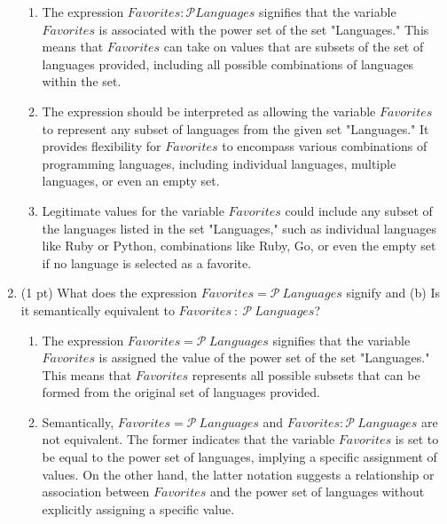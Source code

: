 \documentclass[12pt]{article}
\begin{document}
\begin{spacing}{1.5}
\begin{enumerate}
		      \begin{enumerate}
		      	\item The expression $Favorites : \mathcal{P} Languages$ signifies that the variable $Favorites$ is associated with the power set of the set "Languages." This means that $Favorites$ can take on values that are subsets of the set of languages provided, including all possible combinations of languages within the set. 
		      	      		      	                      
		      	\item The expression should be interpreted as allowing the variable $Favorites$ to represent any subset of languages from the given set "Languages." It provides flexibility for $Favorites$ to encompass various combinations of programming languages, including individual languages, multiple languages, or even an empty set. 
		      	      		      	                      
		      	\item Legitimate values for the variable $Favorites$ could include any subset of the languages listed in the set "Languages," such as individual languages like Ruby or Python, combinations like {Ruby, Go}, or even the empty set if no language is selected as a favorite.
		      \end{enumerate}
		      		      
		\item (1 pt) What does the expression $Favorites = \mathcal{P} \: Languages$ signify and (b) Is it semantically equivalent to $Favorites \: : \: \mathcal{P} \: Languages$?
		      		      
		      \begin{enumerate}
		      	\item The expression $Favorites = \mathcal{P} \: Languages$ signifies that the variable $Favorites$ is assigned the value of the power set of the set "Languages." This means that $Favorites$ represents all possible subsets that can be formed from the original set of languages provided. 
		      	      		      	                      
		      	\item Semantically, $Favorites = \mathcal{P} \: Languages$ and $Favorites : \mathcal{P} \: Languages$ are not equivalent. The former indicates that the variable $Favorites$ is set to be equal to the power set of languages, implying a specific assignment of values. On the other hand, the latter notation suggests a relationship or association between $Favorites$ and the power set of languages without explicitly assigning a specific value.\\
		      \end{enumerate}
		      		                  

\end{enumerate}
\end{spacing}
\end{document}

